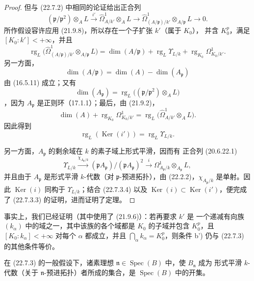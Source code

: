 \begin{proof}
但与 (22.7.2) 中相同的论证给出正合列
\[
  (\mathfrak p/\mathfrak p^2)\otimes_AL\xrightarrow{i'}
  \widehat\Omega^1_{A/k'}\otimes_AL\longrightarrow
  \widehat\Omega^1_{(A/\mathfrak p)/k'}\otimes_{A/\mathfrak p}L
  \longrightarrow0.
\]
所作假设容许应用 (21.9.8)，所以存在一个子扩张 $k'$（属于 $K_0$），
并含 $K_0^p$，满足 $[K_0:k']<+\infty$，并且
\[
  \operatorname{rg}_L\bigl(\widehat\Omega^1_{(A/\mathfrak p)/k'}
  \otimes_{A/\mathfrak p}L\bigr)
  =\dim(A/\mathfrak p)+\operatorname{rg}_L\Upsilon_{L/k}
  +\operatorname{rg}_{K_0}\Omega^1_{K_0/k'}.
\]
另一方面，
\[
  \dim(A/\mathfrak p)=\dim(A)-\dim(A_{\mathfrak p})
\]
由 (16.5.11) 成立；又有
\[
  \dim(A_{\mathfrak p})
  =\operatorname{rg}_L\bigl((\mathfrak p/\mathfrak p^2)\otimes_AL\bigr)
\]
，因为 $A_{\mathfrak p}$ 是正则环（17.1.1）；最后，由 (21.9.2)，
\[
  \dim(A)+\operatorname{rg}_{K_0}\Omega^1_{K_0/k'}
  =\operatorname{rg}_L\bigl(\widehat\Omega^1_{A/k'}\otimes_AL\bigr).
\]
因此得到
\begin{equation}
\label{0.22.7.3.4-fr}
  \operatorname{rg}_L(\operatorname{Ker}(i'))=\operatorname{rg}_L\Upsilon_{L/k}.
  \tag{22.7.3.4}
\end{equation}

另一方面，$A_{\mathfrak p}$ 的剩余域在 $k$ 的素子域上形式平滑，因而有
正合列 (20.6.22.1)
\[
  \Upsilon_{L/k}\xrightarrow{\chi_{A_{\mathfrak p}/k}}
  (\mathfrak pA_{\mathfrak p})/(\mathfrak pA_{\mathfrak p})^2
  \xrightarrow{i}\Omega^1_{A_{\mathfrak p}/k}
  \otimes_{A_{\mathfrak p}}L,
\]
并且由于 $A_{\mathfrak p}$ 是形式平滑 $k$-代数（对
$\mathfrak p$-预进拓扑），由 (22.2.2)，$\chi_{A_{\mathfrak p}/k}$ 是单射。因此
$\operatorname{Ker}(i)$ 同构于 $\Upsilon_{L/k}$；结合 (22.7.3.4) 以及
$\operatorname{Ker}(i)\subset\operatorname{Ker}(i')$，便完成了
(22.7.3.3) 的证明，进而证明了定理。
\end{proof}


\begin{remark}[22.7.4]
\label{0.22.7.4-fr}
事实上，我们已经证明（其中使用了 (21.9.6)）：若再要求 $k'$ 是
一个递减有向族 $(k_\alpha)$ 中的域之一，其中该族的各个域都是
$K_0$ 的子域并包含 $K_0^p$，且 $[K_0:k_\alpha]<+\infty$ 对每个
$\alpha$ 都成立，并且
$\bigcap_\alpha k_\alpha=K_0^p$，则条件 b') 仍与 (22.7.3) 的其他条件等价。
\end{remark}

\begin{corollary}[22.7.5]
\label{0.22.7.5-fr}
在 (22.7.3) 的一般假设下，诸素理想
$\mathfrak n\in\operatorname{Spec}(B)$ 中，使 $B_{\mathfrak n}$ 成为
形式平滑 $k$-代数（关于 $\mathfrak n$-预进拓扑）者所成的集合，是
$\operatorname{Spec}(B)$ 中的开集。
\end{corollary}

